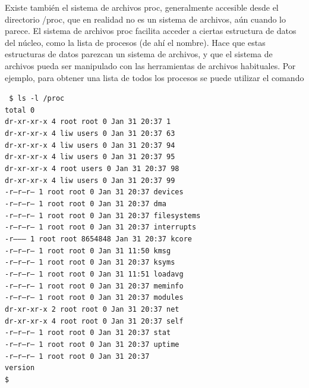 \documentclass[12pt]{article}
\begin{document}
Existe también el sistema de archivos proc, generalmente accesible desde el directorio /proc, que en realidad no es un sistema de archivos, aún cuando lo parece. El sistema de archivos proc facilita acceder a ciertas estructura de datos del núcleo, como la lista de procesos (de ahí el nombre). Hace que estas estructuras de datos parezcan un sistema de archivos, y que el sistema de archivos pueda ser manipulado con las herramientas de archivos habituales. Por ejemplo, para obtener una lista de todos los procesos se puede utilizar el comando

{\tt
\$ ls -l /proc\\
total 0\\
dr-xr-xr-x   4 root     root            0 Jan 31 20:37 1\\
dr-xr-xr-x   4 liw      users           0 Jan 31 20:37 63\\
dr-xr-xr-x   4 liw      users           0 Jan 31 20:37 94\\
dr-xr-xr-x   4 liw      users           0 Jan 31 20:37 95\\
dr-xr-xr-x   4 root     users           0 Jan 31 20:37 98\\
dr-xr-xr-x   4 liw      users           0 Jan 31 20:37 99\\
-r--r--r--   1 root     root            0 Jan 31 20:37 devices\\
-r--r--r--   1 root     root            0 Jan 31 20:37 dma\\
-r--r--r--   1 root     root            0 Jan 31 20:37 filesystems\\
-r--r--r--   1 root     root            0 Jan 31 20:37 interrupts\\
-r--------   1 root     root      8654848 Jan 31 20:37 kcore\\
-r--r--r--   1 root     root            0 Jan 31 11:50 kmsg\\
-r--r--r--   1 root     root            0 Jan 31 20:37 ksyms\\
-r--r--r--   1 root     root            0 Jan 31 11:51 loadavg\\
-r--r--r--   1 root     root            0 Jan 31 20:37 meminfo\\
-r--r--r--   1 root     root            0 Jan 31 20:37 modules\\
dr-xr-xr-x   2 root     root            0 Jan 31 20:37 net\\
dr-xr-xr-x   4 root     root            0 Jan 31 20:37 self\\
-r--r--r--   1 root     root            0 Jan 31 20:37 stat\\
-r--r--r--   1 root     root            0 Jan 31 20:37 uptime\\
-r--r--r--   1 root     root            0 Jan 31 20:37 \\
version\\
\$\\
}
\end{document}

